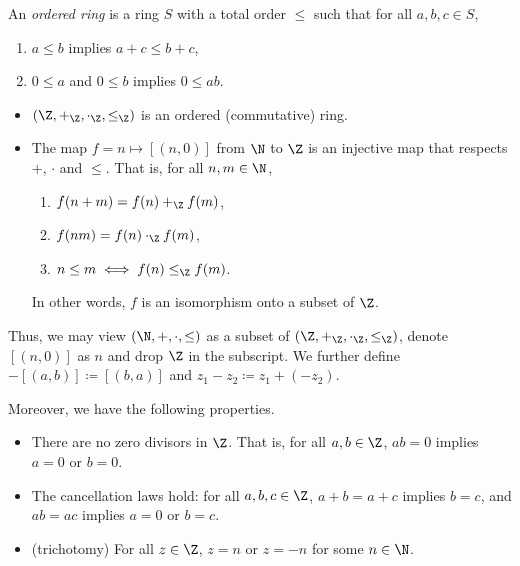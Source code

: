 \begin{definition} \label{def:ordered_ring}
    An \emph{ordered ring} is a ring $S$ with a total order $\leq$ such that
    for all $a, b, c \in S$,
    \begin{enumerate}
        \item $a \leq b$ implies $a + c \leq b + c$,
        \item $0 \leq a$ and $0 \leq b$ implies $0 \leq ab$.
    \end{enumerate}
\end{definition}

\begin{theorem} \leavevmode
    \begin{itemize}
        \item $(\Z, +_\Z, \cdot_\Z, \leq_\Z)$ is an ordered (commutative) ring.
        \item The map $f = n \mapsto [(n, 0)]$ from $\N$ to $\Z$ is an
        injective map that respects $+$, $\cdot$ and $\leq$.
        That is, for all $n, m \in \N$,
        \begin{enumerate}
            \item $f(n + m) = f(n) +_\Z f(m)$,
            \item $f(nm) = f(n) \cdot_\Z f(m)$,
            \item $n \leq m \iff f(n) \leq_\Z f(m)$.
        \end{enumerate}
        In other words, $f$ is an isomorphism onto a subset of $\Z$.
    \end{itemize}
\end{theorem}
Thus, we may view $(\N, +, \cdot, \le)$ as a subset of $(\Z, +_\Z, \cdot_\Z,
\leq_\Z)$, denote $[(n, 0)]$ as $n$ and drop $\Z$ in the subscript.
We further define $-[(a, b)] \coloneq [(b, a)]$ and $z_1 - z_2 \coloneq z_1 +
(-z_2)$.

Moreover, we have the following properties.
\begin{proposition} \leavevmode
    \begin{itemize}
        \item There are no zero divisors in $\Z$.
        That is, for all $a, b \in \Z$, $ab = 0$ implies $a = 0$ or $b = 0$.
        \item The cancellation laws hold:
        for all $a, b, c \in \Z$, $a + b = a + c$ implies $b = c$,
        and $ab = ac$ implies $a = 0$ or $b = c$.
        \item (trichotomy) For all $z \in \Z$, $z = n$ or $z = -n$ for some
        $n \in \N$.
    \end{itemize}
\end{proposition}

